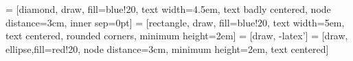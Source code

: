  = [diamond, draw, fill=blue!20, 
    text width=4.5em, text badly centered, node distance=3cm, inner sep=0pt]
 = [rectangle, draw, fill=blue!20, 
    text width=5em, text centered, rounded corners, minimum height=2em]
 = [draw, -latex']
 = [draw, ellipse,fill=red!20, node distance=3cm,
    minimum height=2em, text centered]
   
   
\newsavebox\myboxa
\savebox{}
    
    
